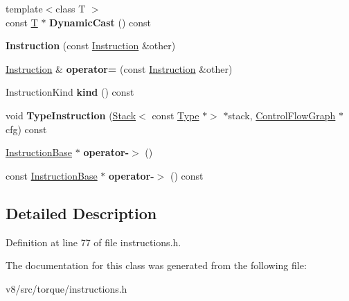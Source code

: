 \begin{DoxyCompactItemize}
\item 
\mbox{\label{classv8_1_1internal_1_1torque_1_1Instruction_af378c833fa25c09dd8a9e8798a34eb72}} 
{\footnotesize template$<$class T $>$ }\\const \mbox{\hyperlink{classv8_1_1internal_1_1torque_1_1T}{T}} $\ast$ {\bfseries Dynamic\+Cast} () const
\item 
\mbox{\label{classv8_1_1internal_1_1torque_1_1Instruction_a9acf13287dc3bc5bbca9db34023fa2aa}} 
{\bfseries Instruction} (const \mbox{\hyperlink{classv8_1_1internal_1_1torque_1_1Instruction}{Instruction}} \&other)
\item 
\mbox{\label{classv8_1_1internal_1_1torque_1_1Instruction_af40acdaa7f37086bc2fb9d8e1f344881}} 
\mbox{\hyperlink{classv8_1_1internal_1_1torque_1_1Instruction}{Instruction}} \& {\bfseries operator=} (const \mbox{\hyperlink{classv8_1_1internal_1_1torque_1_1Instruction}{Instruction}} \&other)
\item 
\mbox{\label{classv8_1_1internal_1_1torque_1_1Instruction_ad63b1a43cefddbf9508aafa421a24178}} 
Instruction\+Kind {\bfseries kind} () const
\item 
\mbox{\label{classv8_1_1internal_1_1torque_1_1Instruction_a5ae5544b19667d86dd8231e70b38fee1}} 
void {\bfseries Type\+Instruction} (\mbox{\hyperlink{classv8_1_1internal_1_1torque_1_1Stack}{Stack}}$<$ const \mbox{\hyperlink{classv8_1_1internal_1_1torque_1_1Type}{Type}} $\ast$$>$ $\ast$stack, \mbox{\hyperlink{classv8_1_1internal_1_1torque_1_1ControlFlowGraph}{Control\+Flow\+Graph}} $\ast$cfg) const
\item 
\mbox{\label{classv8_1_1internal_1_1torque_1_1Instruction_a6df79996ba572f5159f654d37de05f64}} 
\mbox{\hyperlink{structv8_1_1internal_1_1torque_1_1InstructionBase}{Instruction\+Base}} $\ast$ {\bfseries operator-\/$>$} ()
\item 
\mbox{\label{classv8_1_1internal_1_1torque_1_1Instruction_aa0bbc5e6b21beacb238218a459ebcc4c}} 
const \mbox{\hyperlink{structv8_1_1internal_1_1torque_1_1InstructionBase}{Instruction\+Base}} $\ast$ {\bfseries operator-\/$>$} () const
\end{DoxyCompactItemize}


\subsection{Detailed Description}


Definition at line 77 of file instructions.\+h.



The documentation for this class was generated from the following file\+:\begin{DoxyCompactItemize}
\item 
v8/src/torque/instructions.\+h\end{DoxyCompactItemize}

